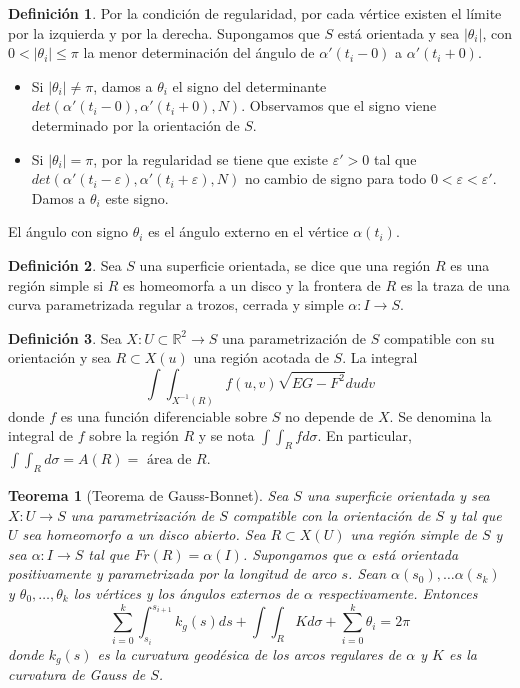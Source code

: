 \documentclass{report}
\newtheorem{theorem}{Teorema}[chapter]
\theoremstyle{remark}
\theoremstyle{remark}
\theoremstyle{definition}
\newtheorem{definition}{Definición}[chapter]
\theoremstyle{definition}
\theoremstyle{definition}
\begin{document}
\begin{definition}
    Por la condición de regularidad, por cada vértice existen el límite por la izquierda y por la derecha.
    Supongamos que $S$ está orientada y sea $|\theta_i|$, con $0 < |\theta_i| \leq \pi$ la menor determinación del ángulo de $\alpha'(t_i - 0)$ a $\alpha'(t_i + 0)$.
    \begin{itemize}
        \item Si $|\theta_i| \neq \pi$, damos a $\theta_i$ el signo del determinante $det(\alpha'(t_i-0), \alpha'(t_i+0), N)$.
              Observamos que el signo viene determinado por la orientación de $S$.
        \item Si $|\theta_i| = \pi$, por la regularidad se tiene que existe $\varepsilon'>0$ tal que $det(\alpha'(t_i-\varepsilon), \alpha'(t_i+\varepsilon), N)$ no cambio de signo para todo $0 < \varepsilon < \varepsilon'$.
              Damos a $\theta_i$ este signo.
    \end{itemize}
    El ángulo con signo $\theta_i$ es el ángulo externo en el vértice $\alpha(t_i)$.
\end{definition}

\begin{definition}
    Sea $S$ una superficie orientada, se dice que una región $R$ es una región simple si $R$ es homeomorfa a un disco y la frontera de $R$ es la traza de una curva parametrizada regular a trozos, cerrada y simple $\alpha: I \to S$.
\end{definition}

\begin{definition}
    Sea $X: U \subset \mathbb{R}^2 \to S$ una parametrización de $S$ compatible con su orientación y sea $R \subset X(u)$ una región acotada de $S$.
    La integral $$\int\int_{X^{-1}(R)} f(u, v) \sqrt{EG-F^2} dudv$$ donde $f$ es una función diferenciable sobre $S$ no depende de $X$.
    Se denomina la integral de $f$ sobre la región $R$ y se nota $\int\int_R f d\sigma$.
    En particular, $\int\int_R d\sigma = A(R) = \text{ área de } R$.
\end{definition}

\begin{theorem}[Teorema de Gauss-Bonnet]
    Sea $S$ una superficie orientada y sea $X: U \to S$ una parametrización de $S$ compatible con la orientación de $S$ y tal que $U$ sea homeomorfo a un disco abierto.
    Sea $R \subset X(U)$ una región simple de $S$ y sea $\alpha: I \to S$ tal que $Fr(R) = \alpha(I)$.
    Supongamos que $\alpha$ está orientada positivamente y parametrizada por la longitud de arco $s$.
    Sean $\alpha(s_0), \dots \alpha(s_k)$ y $\theta_0, \dots, \theta_k$ los vértices y los ángulos externos de $\alpha$ respectivamente.
    Entonces
    $$\sum_{i=0}^k \int_{s_i}^{s_{i+1}} k_g(s) ds + \int\int_R K d\sigma + \sum_{i=0}^k \theta_i = 2\pi$$
    donde $k_g(s)$ es la curvatura geodésica de los arcos regulares de $\alpha$ y $K$ es la curvatura de Gauss de $S$.
\end{theorem}
\end{document}
